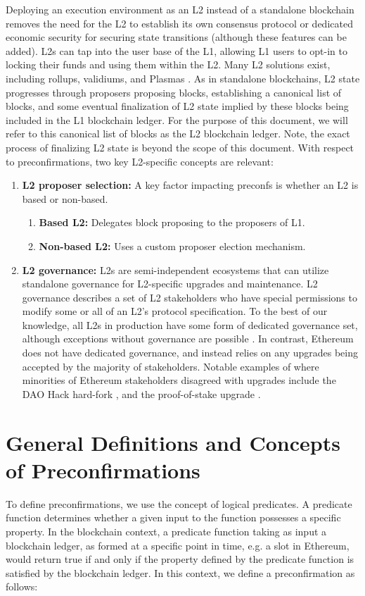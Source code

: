 \documentclass[a4paper]{article}
\theoremstyle{boldstyle}
\begin{document}
Deploying an execution environment as an L2 instead of a standalone blockchain removes the need for the L2 to establish its own consensus protocol or dedicated economic security for securing state transitions (although these features can be added). L2s can tap into the user base of the L1, allowing L1 users to opt-in to locking their funds and using them within the L2. Many L2 solutions exist, including rollups, validiums, and Plasmas \cite{L2_versus_execution_sharding}. As in standalone blockchains, L2 state progresses through proposers proposing blocks, establishing a canonical list of blocks, and some eventual finalization of L2 state implied by these blocks being included in the L1 blockchain ledger. For the purpose of this document, we will refer to this canonical list of blocks as the L2 blockchain ledger.  Note, the exact process of finalizing L2 state is beyond the scope of this document. With respect to preconfirmations, two key L2-specific concepts are relevant:
\begin{enumerate}
    \item \textbf{L2 proposer selection:} A key factor impacting preconfs is whether an L2 is based or non-based. \begin{enumerate}
        \item \textbf{Based L2:} Delegates block proposing to the proposers of L1. 
        \item \textbf{Non-based L2:} Uses a custom proposer election mechanism. 
    \end{enumerate}
    \item \textbf{L2 governance:} L2s are semi-independent ecosystems that can utilize standalone governance for L2-specific upgrades and maintenance. L2 governance describes a set of L2 stakeholders who have special permissions to modify some or all of an L2's protocol specification. To the best of our knowledge, all L2s in production have some form of dedicated governance set, although exceptions without governance are possible \cite{W:NativeRollups-SuperpowersfromL1execution}. In contrast, Ethereum does not have dedicated governance, and instead relies on any upgrades being accepted by the majority of stakeholders. Notable examples of where minorities of Ethereum stakeholders disagreed with upgrades include the DAO Hack hard-fork \cite{wiki_the_DAO}, and the proof-of-stake upgrade \cite{EIP-3675} .
\end{enumerate} 
\fi

\section{General Definitions and Concepts of Preconfirmations}
To define preconfirmations, we use the concept of logical predicates. A predicate function determines whether a given input to the function possesses a specific property. In the blockchain context, a predicate function taking as input a blockchain ledger, as formed at a specific point in time, e.g. a slot in Ethereum, would return true if and only if the property defined by the predicate function is satisfied by the blockchain ledger. In this context, we define a preconfirmation as follows:
 
\end{document}
